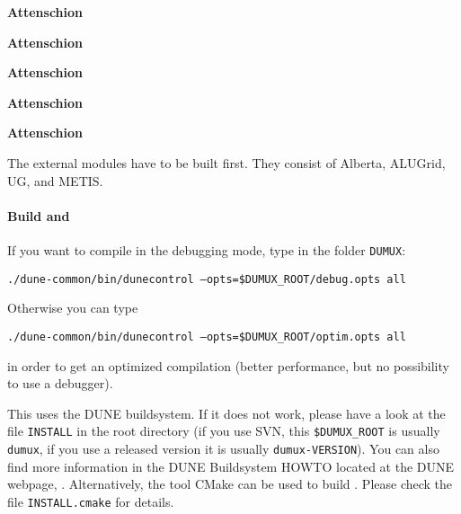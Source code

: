 \begin{turn}{45}\textbf{Attenschion}\end{turn}
\begin{turn}{45}\textbf{Attenschion}\end{turn}
\begin{turn}{45}\textbf{Attenschion}\end{turn}
\begin{turn}{45}\textbf{Attenschion}\end{turn}
\begin{turn}{45}\textbf{Attenschion}\end{turn}

The external modules have to be built first. They consist of Alberta, ALUGrid, UG, and METIS.

\paragraph{Build \Dune and \Dumux}
\label{buildIt}
If you want to compile in the debugging mode, type in the folder \texttt{DUMUX}: 
\begin{center}
\texttt{./dune-common/bin/dunecontrol --opts=\$DUMUX\_ROOT/debug.opts all}
\end{center}

Otherwise you can type
\begin{center}
\texttt{./dune-common/bin/dunecontrol --opts=\$DUMUX\_ROOT/optim.opts all}
\end{center}
in order to get an optimized compilation (better performance, but no possibility to use a debugger).

This uses the DUNE buildsystem. If it does not work, please have a look at
the file \texttt{INSTALL} in the \Dumux root directory (if you use
SVN, this \texttt{\$DUMUX\_ROOT} is usually \texttt{dumux}, if you use
a released version it is usually \texttt{dumux-VERSION}). You can also
find more information in the DUNE Buildsystem HOWTO located at the
DUNE webpage, \cite{DUNE-HP}.  Alternatively, the tool CMake can be
used to build \Dumux. Please check the file \texttt{INSTALL.cmake} for
details.
